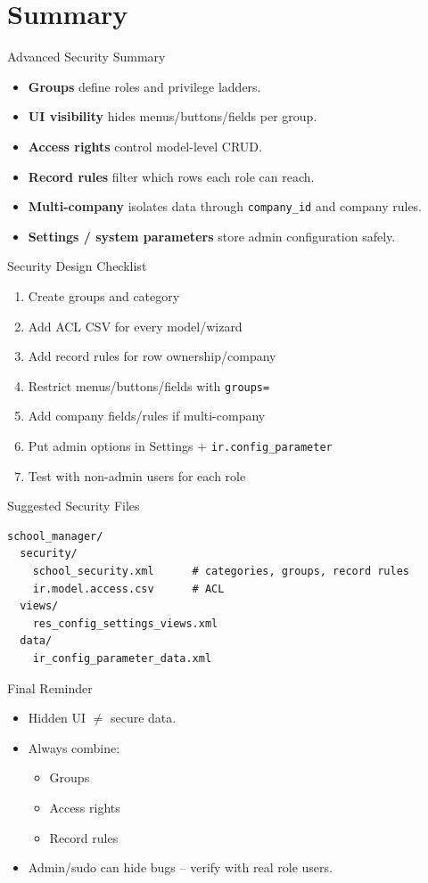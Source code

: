 \section{Summary}

\begin{frame}{Advanced Security Summary}
	\begin{itemize}
		\item \textbf{Groups} define roles and privilege ladders.
		\item \textbf{UI visibility} hides menus/buttons/fields per group.
		\item \textbf{Access rights} control model-level CRUD.
		\item \textbf{Record rules} filter which rows each role can reach.
		\item \textbf{Multi-company} isolates data through \texttt{company\_id} and company rules.
		\item \textbf{Settings / system parameters} store admin configuration safely.
	\end{itemize}
\end{frame}

\begin{frame}{Security Design Checklist}
	\begin{enumerate}
		\item Create groups and category
		\item Add ACL CSV for every model/wizard
		\item Add record rules for row ownership/company
		\item Restrict menus/buttons/fields with \texttt{groups=}
		\item Add company fields/rules if multi-company
		\item Put admin options in Settings + \texttt{ir.config\_parameter}
		\item Test with non-admin users for each role
	\end{enumerate}
\end{frame}

\begin{frame}[fragile]{Suggested Security Files}
\begin{lstlisting}
school_manager/
  security/
    school_security.xml      # categories, groups, record rules
    ir.model.access.csv      # ACL
  views/
    res_config_settings_views.xml
  data/
    ir_config_parameter_data.xml
\end{lstlisting}
\end{frame}

\begin{frame}{Final Reminder}
	\begin{itemize}
		\item Hidden UI $\neq$ secure data.
		\item Always combine:
		\begin{itemize}
			\item Groups
			\item Access rights
			\item Record rules
		\end{itemize}
		\item Admin/sudo can hide bugs -- verify with real role users.
	\end{itemize}
\end{frame}
